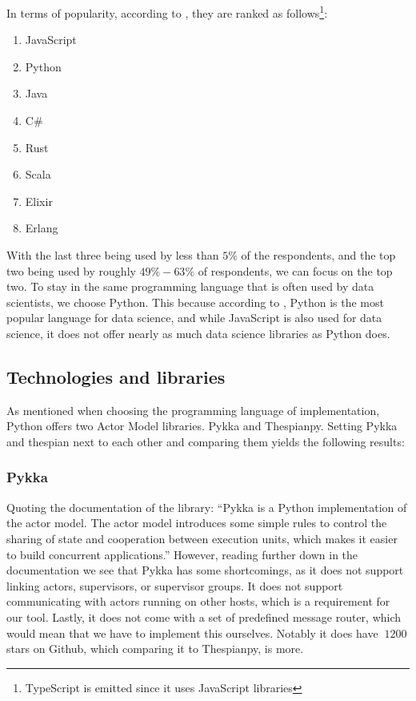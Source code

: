 \documentclass[a4paper]{article}
\begin{document}
In terms of popularity, according to \cite{stackoverflowsurvey}, they are ranked as follows\footnote{TypeScript is emitted since it uses JavaScript libraries}:
\begin{enumerate}
    \item JavaScript
    \item Python
    \item Java
    \item C\#
    \item Rust
    \item Scala
    \item Elixir
    \item Erlang
\end{enumerate}
With the last three being used by less than \(5\%\) of the respondents, and the top two being used by roughly \(49\%-63\%\) of respondents, we can focus on the top two. To stay in the same programming language that is often used by data scientists, we choose Python. This because according to \cite{datasciencelanguage}, Python is the most popular language for data science, and while JavaScript is also used for data science, it does not offer nearly as much data science libraries as Python does.
\subsection{Technologies and libraries}
As mentioned when choosing the programming language of implementation, Python offers two Actor Model libraries. Pykka and Thespianpy. Setting Pykka and thespian next to each other and comparing them yields the following results:
\subsubsection{Pykka}
Quoting the documentation of the library: \enquote{Pykka is a Python implementation of the actor model. The actor model introduces some simple rules to control the sharing of state and cooperation between execution units, which makes it easier to build concurrent applications.} However, reading further down in the documentation we see that Pykka has some shortcomings, as it does not support linking actors, supervisors, or supervisor groups. It does not support communicating with actors running on other hosts, which is a requirement for our tool. Lastly, it does not come with a set of predefined message router, which would mean that we have to implement this ourselves. Notably it does have \(~1200\) stars on Github, which comparing it to Thespianpy, is more.
\end{document}
